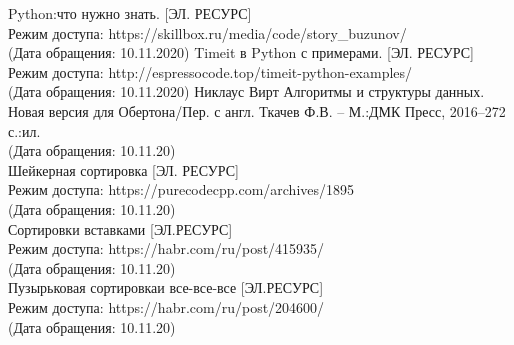 \documentclass[a4paper]{article}
\begin{document}
	\begin{thebibliography}{6}
	Python:что нужно знать. [ЭЛ. РЕСУРС]\\
	Режим доступа: https://skillbox.ru/media/code/story\_buzunov/ \\
	(Дата обращения: 10.11.2020)
	Timeit в Python с примерами. [ЭЛ. РЕСУРС]\\
	Режим доступа: http://espressocode.top/timeit-python-examples/ \\
	(Дата обращения: 10.11.2020)
	\label{virt}
	Никлаус Вирт Алгоритмы и структуры данных. Новая версия для Обертона/Пер. с англ. Ткачев Ф.В. --  М.:ДМК Пресс, 2016--272 с.:ил.\\
	(Дата обращения: 10.11.20)\\
	\label{shakersort}
	Шейкерная сортировка [ЭЛ. РЕСУРС] \\
	Режим доступа: https://purecodecpp.com/archives/1895 \\
	(Дата обращения: 10.11.20)\\
	
	Сортировки вставками [ЭЛ.РЕСУРС] \\
	Режим доступа: https://habr.com/ru/post/415935/ \\
	(Дата обращения: 10.11.20)\\
	
	Пузырьковая сортировкаи все-все-все [ЭЛ.РЕСУРС] \\
	Режим доступа: https://habr.com/ru/post/204600/ \\
	(Дата обращения: 10.11.20)\\
\end{thebibliography}



	
	
\end{document}
